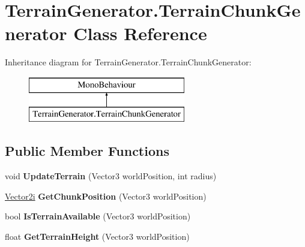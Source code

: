 \hypertarget{class_terrain_generator_1_1_terrain_chunk_generator}{}\section{Terrain\+Generator.\+Terrain\+Chunk\+Generator Class Reference}
\label{class_terrain_generator_1_1_terrain_chunk_generator}
Inheritance diagram for Terrain\+Generator.\+Terrain\+Chunk\+Generator\+:\begin{figure}[H]
\begin{center}
\leavevmode
\includegraphics[height=2.000000cm]{class_terrain_generator_1_1_terrain_chunk_generator}
\end{center}
\end{figure}
\subsection*{Public Member Functions}
\begin{DoxyCompactItemize}
\item 
\mbox{\label{class_terrain_generator_1_1_terrain_chunk_generator_ac7f0c0fab9b0bc2270df31b4651756c1}} 
void {\bfseries Update\+Terrain} (Vector3 world\+Position, int radius)
\item 
\mbox{\label{class_terrain_generator_1_1_terrain_chunk_generator_a248437023f08892165d33b9073b30508}} 
\hyperlink{class_terrain_generator_1_1_vector2i}{Vector2i} {\bfseries Get\+Chunk\+Position} (Vector3 world\+Position)
\item 
\mbox{\label{class_terrain_generator_1_1_terrain_chunk_generator_ac85ab9c94083075a14d7d3de891370c6}} 
bool {\bfseries Is\+Terrain\+Available} (Vector3 world\+Position)
\item 
\mbox{\label{class_terrain_generator_1_1_terrain_chunk_generator_ac02a5434d1546fc7afb7c7d570c7c378}} 
float {\bfseries Get\+Terrain\+Height} (Vector3 world\+Position)
\end{DoxyCompactItemize}
